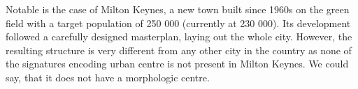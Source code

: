 Notable is the case of Milton Keynes, a new town built since 1960s on the green field
with a target population of 250 000 (currently at 230 000). Its development followed a
carefully designed masterplan, laying out the whole city. However, the resulting
structure is very different from any other city in the country as none of the signatures
encoding urban centre is not present in Milton Keynes. We could say, that it does not
have a morphologic centre.


